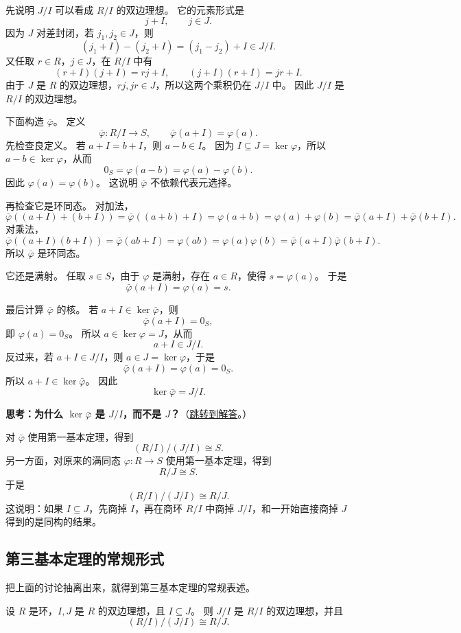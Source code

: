 先说明 $J/I$ 可以看成 $R/I$ 的双边理想。
它的元素形式是
\[
j+I,\qquad j\in J.
\]
因为 $J$ 对差封闭，若 $j_1,j_2\in J$，则
\[
(j_1+I)-(j_2+I)=(j_1-j_2)+I\in J/I.
\]
又任取 $r\in R$，$j\in J$，在 $R/I$ 中有
\[
(r+I)(j+I)=rj+I,\qquad (j+I)(r+I)=jr+I.
\]
由于 $J$ 是 $R$ 的双边理想，$rj,jr\in J$，所以这两个乘积仍在 $J/I$ 中。
因此 $J/I$ 是 $R/I$ 的双边理想。

下面构造 $\bar\varphi$。
定义
\[
\bar\varphi:R/I\to S,\qquad \bar\varphi(a+I)=\varphi(a).
\]
先检查良定义。
若 $a+I=b+I$，则 $a-b\in I$。
因为 $I\subseteq J=\ker\varphi$，所以 $a-b\in\ker\varphi$，从而
\[
0_S=\varphi(a-b)=\varphi(a)-\varphi(b).
\]
因此 $\varphi(a)=\varphi(b)$。
这说明 $\bar\varphi$ 不依赖代表元选择。

再检查它是环同态。
对加法，
\[
\bar\varphi((a+I)+(b+I))
=\bar\varphi((a+b)+I)
=\varphi(a+b)
=\varphi(a)+\varphi(b)
=\bar\varphi(a+I)+\bar\varphi(b+I).
\]
对乘法，
\[
\bar\varphi((a+I)(b+I))
=\bar\varphi(ab+I)
=\varphi(ab)
=\varphi(a)\varphi(b)
=\bar\varphi(a+I)\bar\varphi(b+I).
\]
所以 $\bar\varphi$ 是环同态。

它还是满射。
任取 $s\in S$，由于 $\varphi$ 是满射，存在 $a\in R$，使得 $s=\varphi(a)$。
于是
\[
\bar\varphi(a+I)=\varphi(a)=s.
\]

最后计算 $\bar\varphi$ 的核。
若 $a+I\in\ker\bar\varphi$，则
\[
\bar\varphi(a+I)=0_S,
\]
即 $\varphi(a)=0_S$。
所以 $a\in\ker\varphi=J$，从而
\[
a+I\in J/I.
\]
反过来，若 $a+I\in J/I$，则 $a\in J=\ker\varphi$，于是
\[
\bar\varphi(a+I)=\varphi(a)=0_S.
\]
所以 $a+I\in\ker\bar\varphi$。
因此
\[
\ker\bar\varphi=J/I.
\]

\hypertarget{q:third-iso-kernel}{}
\medskip
\noindent\textbf{思考：为什么 $\ker\bar\varphi$ 是 $J/I$，而不是 $J$？}（\hyperlink{ans:third-iso-kernel}{跳转到解答}。）
\medskip

对 $\bar\varphi$ 使用第一基本定理，得到
\[
(R/I)/(J/I)\cong S.
\]
另一方面，对原来的满同态 $\varphi:R\to S$ 使用第一基本定理，得到
\[
R/J\cong S.
\]
于是
\[
(R/I)/(J/I)\cong R/J.
\]
这说明：如果 $I\subseteq J$，先商掉 $I$，再在商环 $R/I$ 中商掉 $J/I$，和一开始直接商掉 $J$ 得到的是同构的结果。

\subsection{第三基本定理的常规形式}\label{sec:third-isomorphism-theorem-rings}

把上面的讨论抽离出来，就得到第三基本定理的常规表述。

\begin{theorem}[环同态第三基本定理]\label{thm:third-isomorphism-theorem-rings}
设 $R$ 是环，$I,J$ 是 $R$ 的双边理想，且 $I\subseteq J$。
则 $J/I$ 是 $R/I$ 的双边理想，并且
\[
(R/I)/(J/I)\cong R/J.
\]
\end{theorem}

